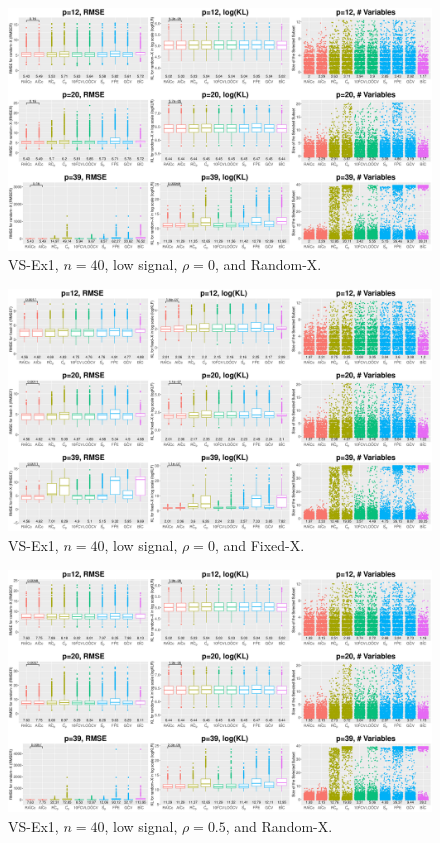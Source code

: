 \clearpage
\begin{figure}[!ht]
\centering
\includegraphics[width=\textwidth]{figures/supplement/randomx_VS-Ex1_n40_lsnr_rho0.eps}
\caption{VS-Ex1, $n=40$, low signal, $\rho=0$, and Random-X.}
\end{figure}
\begin{figure}[!ht]
\centering
\includegraphics[width=\textwidth]{figures/supplement/fixedx_VS-Ex1_n40_lsnr_rho0.eps}
\caption{VS-Ex1, $n=40$, low signal, $\rho=0$, and Fixed-X.}
\end{figure}
\clearpage
\begin{figure}[!ht]
\centering
\includegraphics[width=\textwidth]{figures/supplement/randomx_VS-Ex1_n40_lsnr_rho05.eps}
\caption{VS-Ex1, $n=40$, low signal, $\rho=0.5$, and Random-X.}
\end{figure}
